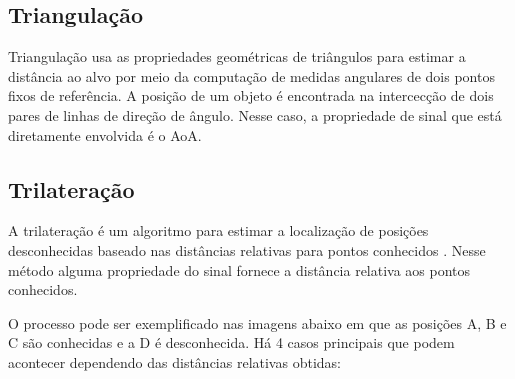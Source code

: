 \subsection{Triangulação}
Triangulação usa as propriedades geométricas de triângulos para estimar a distância ao alvo por meio da computação de medidas angulares de dois pontos fixos de referência.
A posição de um objeto é encontrada na intercecção de dois pares de linhas de direção de ângulo.
Nesse caso, a propriedade de sinal que está diretamente envolvida é o AoA.

\subsection{Trilateração}
\label{sec:trilateracao}

A trilateração é um algoritmo para estimar a localização de posições desconhecidas baseado nas distâncias relativas para pontos conhecidos \cite{art12}.
Nesse método alguma propriedade do sinal fornece a distância relativa aos pontos conhecidos.

O processo pode ser exemplificado nas imagens abaixo em que as posições A, B e C são conhecidas e a D é desconhecida. Há 4 casos principais que podem acontecer dependendo das distâncias relativas obtidas:

